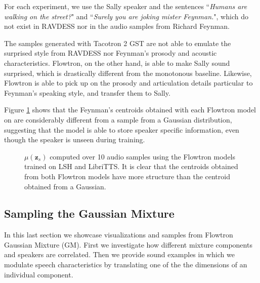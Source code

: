 \documentclass{article}
\begin{document}
For each experiment, we use the Sally speaker and the sentences ``\textit{Humans are walking on the street?}" and ``\textit{Surely you are joking mister Feynman.}", which do not exist in RAVDESS nor in the audio samples from Richard Feynman. 

The samples generated with Tacotron 2 GST are not able to emulate the surprised style from RAVDESS nor Feynman's prosody and acoustic characteristics. Flowtron, on the other hand, is able to make Sally sound surprised, which is drastically different from the monotonous baseline. Likewise, Flowtron is able to pick up on the prosody and articulation details particular to Feynman's speaking style, and transfer them to Sally.

\if
Figure \ref{fig:z_centroids} shows that the Feynman's centroids obtained with each Flowtron model on are considerably different from a sample from a Gaussian distribution, suggesting that the model is able to store speaker specific information, even though the speaker is unseen during training. 

\begin{figure}[!ht]
    \centering
    
    
    \caption{$\mu(\boldsymbol{z}_{s})$ computed over 10 audio samples using the Flowtron models trained on LSH and LibriTTS. It is clear that the centroids obtained from both Flowtron models have more structure than the centroid obtained from a Gaussian.}
    \label{fig:z_centroids}
\end{figure}
\fi \subsection{Sampling the Gaussian Mixture}\label{sec:sampling_gm}
In this last section we showcase visualizations and samples from Flowtron Gaussian Mixture (GM). First we investigate how different mixture components and speakers are correlated. Then we provide sound examples in which we modulate speech characteristics by translating one of the the dimensions of an individual component.
\end{document}
